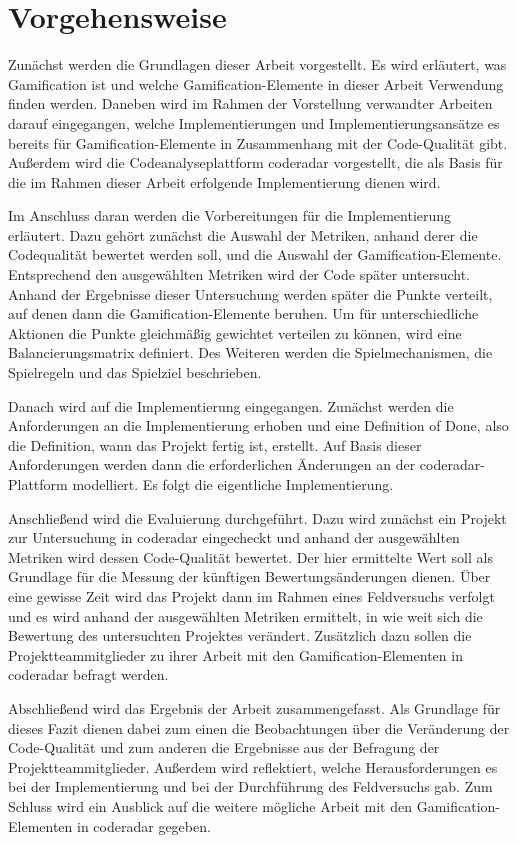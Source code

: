 \documentclass[fontsize=11pt, paper=a4, parskip=half]{scrartcl}
\begin{document}
\section{Vorgehensweise}
Zunächst werden die Grundlagen dieser Arbeit vorgestellt.
Es wird erläutert, was Gamification ist und welche Gamification-Elemente in dieser Arbeit Verwendung finden werden.
Daneben wird im Rahmen der Vorstellung verwandter Arbeiten darauf eingegangen, welche Implementierungen und Implementierungsansätze es bereits für Gamification-Elemente in Zusammenhang mit der Code-Qualität gibt.
Außerdem wird die Codeanalyseplattform coderadar vorgestellt, die als Basis für die im Rahmen dieser Arbeit erfolgende Implementierung dienen wird.

Im Anschluss daran werden die Vorbereitungen für die Implementierung erläutert.
Dazu gehört zunächst die Auswahl der Metriken, anhand derer die Codequalität bewertet werden soll, und die Auswahl der Gamification-Elemente.
Entsprechend den ausgewählten Metriken wird der Code später untersucht.
Anhand der Ergebnisse dieser Untersuchung werden später die Punkte verteilt, auf denen dann die Gamification-Elemente beruhen.
Um für unterschiedliche Aktionen die Punkte gleichmäßig gewichtet verteilen zu können, wird eine Balancierungsmatrix definiert.
Des Weiteren werden die Spielmechanismen, die Spielregeln und das Spielziel beschrieben.

Danach wird auf die Implementierung eingegangen.
Zunächst werden die Anforderungen an die Implementierung erhoben und eine Definition of Done, also die Definition, wann das Projekt fertig ist, erstellt.
Auf Basis dieser Anforderungen werden dann die erforderlichen Änderungen an der coderadar-Plattform modelliert.
Es folgt die eigentliche Implementierung.

Anschließend wird die Evaluierung durchgeführt.
Dazu wird zunächst ein Projekt zur Untersuchung in coderadar eingecheckt und anhand der ausgewählten Metriken wird dessen Code-Qualität bewertet.
Der hier ermittelte Wert soll als Grundlage für die Messung der künftigen Bewertungsänderungen dienen.
Über eine gewisse Zeit wird das Projekt dann im Rahmen eines Feldversuchs verfolgt und es wird anhand der ausgewählten Metriken ermittelt, in wie weit sich die Bewertung des untersuchten Projektes verändert.
Zusätzlich dazu sollen die Projektteammitglieder zu ihrer Arbeit mit den Gamification-Elementen in coderadar befragt werden.

Abschließend wird das Ergebnis der Arbeit zusammengefasst.
Als Grundlage für dieses Fazit dienen dabei zum einen die Beobachtungen über die Veränderung der Code-Qualität und zum anderen die Ergebnisse aus der Befragung der Projektteammitglieder.
Außerdem wird reflektiert, welche Herausforderungen es bei der Implementierung und bei der Durchführung des Feldversuchs gab.
Zum Schluss wird ein Ausblick auf die weitere mögliche Arbeit mit den Gamification-Elementen in coderadar gegeben.

\pagebreak



\end{document}
